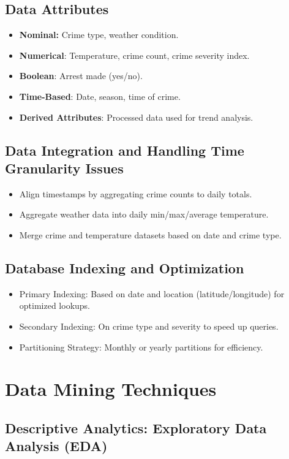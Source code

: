 \documentclass[sigconf,twocolumn,11pt]{acmart}
\begin{document}
\subsection{Data Attributes}
\begin{itemize}
    \item \textbf{Nominal:} Crime type, weather condition.
    \item \textbf{Numerical}: Temperature, crime count, crime severity index.
    \item \textbf{Boolean}: Arrest made (yes/no).
    \item \textbf{Time-Based}: Date, season, time of crime.
    \item \textbf{Derived Attributes}: Processed data used for trend analysis.

\end{itemize}


\subsection{Data Integration and Handling Time Granularity Issues}
\begin{itemize}
    \item Align timestamps by aggregating crime counts to daily totals.
    \item Aggregate weather data into daily min/max/average temperature.
    \item Merge crime and temperature datasets based on date and crime type.
\end{itemize}

\subsection{Database Indexing and Optimization}
\begin{itemize}
    \item Primary Indexing: Based on date and location (latitude/longitude) for optimized lookups.
    \item Secondary Indexing: On crime type and severity to speed up queries.
    \item Partitioning Strategy: Monthly or yearly partitions for efficiency.
\end{itemize}

\section{Data Mining Techniques}
\subsection{Descriptive Analytics: Exploratory Data Analysis (EDA)}
\end{document}
